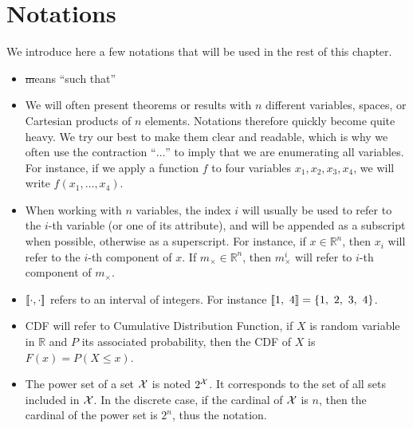 \section{Notations}
We introduce here a few notations that will be used in the rest of this chapter. 
\begin{itemize}
    \item \st means ``such that''
    \item We will often present theorems or results with $n$ different variables, spaces, or Cartesian products of $n$ elements. Notations therefore quickly become quite heavy. We try our best to make them clear and readable, which is why we often use the contraction ``$\dots$'' to imply that we are enumerating all variables. For instance, if we apply a function $f$ to four variables $x_1, x_2, x_3, x_4$, we will write $f(x_1, \dots, x_4)$.
    \item When working with $n$ variables, the index $i$ will usually be used to refer to the $i$-th variable (or one of its attribute), and will be appended as a subscript when possible, otherwise as a superscript. For instance, if $x\in\mathbb{R}^n$, then $x_i$ will refer to the $i$-th component of $x$. If $m_\times\in\mathbb{R}^n$, then $m_\times^i$ will refer to $i$-th component of $m_\times$.
    \item ${[\![}\cdot,\cdot{]\!]}$ refers to an interval of integers. For instance ${[\![}1,~4{]\!]}=\{1,~2,~3,~4\}$. 
    \item CDF will refer to Cumulative Distribution Function, \ie if $X$ is random variable in $\mathbb{R}$ and $P$ its associated probability, then the CDF of $X$ is $F(x)=P(X\leqslant x)$.
    \item The power set of a set ${\mathcal{X}}$ is noted $2^{\mathcal{X}}$. It corresponds to the set of all sets included in ${\mathcal{X}}$. In the discrete case, if the cardinal of ${\mathcal{X}}$ is $n$, then the cardinal of the power set is $2^n$, thus the notation.
\end{itemize}

